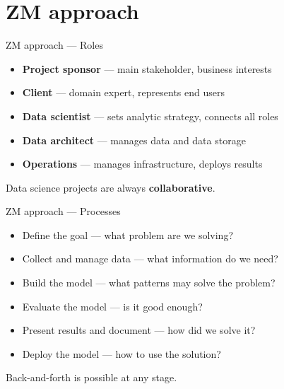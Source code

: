 \section{ZM approach}

\begin{frame}{ZM approach --- Roles}
  \begin{itemize}
    \item \textbf{Project sponsor} --- main stakeholder, business interests
    \item \textbf{Client} --- domain expert, represents end users
    \item \textbf{Data scientist} --- sets analytic strategy, connects all roles
    \item \textbf{Data architect} --- manages data and data storage
    \item \textbf{Operations} --- manages infrastructure, deploys results
  \end{itemize}

  \vspace{0.3cm}
  Data science projects are always \textbf{collaborative}.
\end{frame}

\begin{frame}{ZM approach --- Processes}
  \begin{itemize}
    \item Define the goal --- what problem are we solving?
    \item Collect and manage data --- what information do we need?
    \item Build the model --- what patterns may solve the problem?
    \item Evaluate the model --- is it good enough?
    \item Present results and document --- how did we solve it?
    \item Deploy the model --- how to use the solution?
  \end{itemize}

  \vspace{0.3cm}
  Back-and-forth is possible at any stage.
\end{frame}


